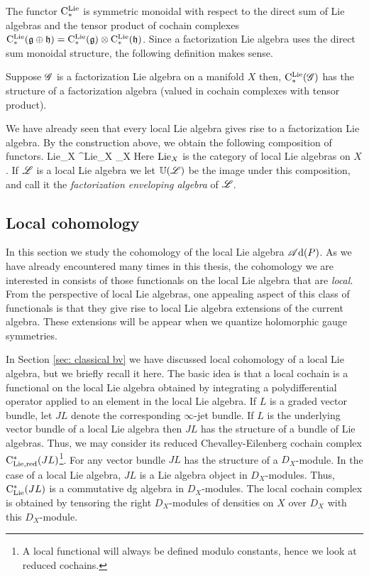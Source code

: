 The functor ${\rm C}^{\rm Lie}_*$ is symmetric monoidal with respect to the direct sum of Lie algebras and the tensor product of cochain complexes ${\rm C}^{\rm Lie}_*(\mathfrak g \oplus \mathfrak h) = {\rm C}^{\rm Lie}_*(\mathfrak g) \otimes {\rm C}^{\rm Lie}_*(\mathfrak h)$. 
Since a factorization Lie algebra uses the direct sum monoidal structure, the following definition makes sense.

\begin{dfn/lem}
Suppose $\mathscr G$ is a factorization Lie algebra on a manifold $X$ then, ${\rm C}^{\rm Lie}_*(\mathscr G)$ has the structure of a factorization algebra (valued in cochain complexes with tensor product). 
\end{dfn/lem}

We have already seen that every local Lie algebra gives rise to a factorization Lie algebra.
By the construction above, we obtain the following composition of functors.
\ben
{\rm Lie}_X ^{\rm Lie}_X _X
\een
Here ${\rm Lie}_X$ is the category of local Lie algebras on $X$.
If $\mathscr L$ is a local Lie algebra we let $\mathbb U(\mathscr L)$ be the image under this composition, and call it the {\em factorization enveloping algebra} of $\mathscr L$. 

\subsection{Local cohomology}

In this section we study the cohomology of the local Lie algebra $\mathscr A{\rm d}(P)$.
As we have already encountered many times in this thesis, the cohomology we are interested in consists of those functionals on the local Lie algebra that are {\em local}.
From the perspective of local Lie algebras, one appealing aspect of this class of functionals is that they give rise to local Lie algebra extensions of the current algebra.
These extensions will be appear when we quantize holomorphic gauge symmetries.

In Section \ref{sec: classical bv} we have discussed local cohomology of a local Lie algebra, but we briefly recall it here.
The basic idea is that a local cochain is a functional on the local Lie algebra obtained by integrating a polydifferential operator applied to an element in the local Lie algebra.
If $L$ is a graded vector bundle, let $JL$ denote the corresponding $\infty$-jet bundle. 
If $L$ is the underlying vector bundle of a local Lie algebra then $JL$ has the structure of a bundle of Lie algebras.
Thus, we may consider its reduced Chevalley-Eilenberg cochain complex ${\rm C}_{\rm Lie, red}^*(JL)$\footnote{A local functional will always be defined modulo constants, hence we look at reduced cochains.}.
For any vector bundle $JL$ has the structure of a $D_X$-module.
In the case of a local Lie algebra, $JL$ is a Lie algebra object in $D_X$-modules.
Thus, ${\rm C}_{{\rm Lie}}^*(JL)$ is a commutative dg algebra in $D_X$-modules. 
The local cochain complex is obtained by tensoring the right $D_X$-modules of densities on $X$ over $D_X$ with this $D_X$-module.

